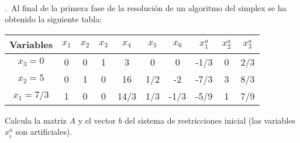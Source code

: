 \documentclass[11pt,a4paper,twoside]{article}
\newcounter{problem} \setcounter{problem}{1}
\newcommand{\ex}{\noindent {\sf \bf \theproblem}\addtocounter{problem}{1}.\ }
\begin{document}
\

\ex Al final de la primera fase de la resoluci\'on de un algoritmo
del simplex se ha obtenido la siguiente tabla:



\begin{center}
\begin{tabular}{c||c|c|c|c|c|c|c|c|c}
Variables&$x_1$&$x_2$&$x_3$&$x_4$&$x_5$&$x_6$&$x_1^a$&$x_2^a$&$x_3^a$\\
\hline
$x_3=0$&0&0&1&3&0&0&-1/3&0&2/3\\
$x_2=5$&0&1&0&16&1/2&-2&-7/3&3&8/3\\
$x_1=7/3$&1&0&0&14/3&1/3&-1/3&-5/9&1&7/9\\
\end{tabular}
\end{center}



Calcula la matriz $A$ y el vector $b$ del sistema de restricciones
inicial (las variables $x_i^a$ son artificiales).



\end{document}
